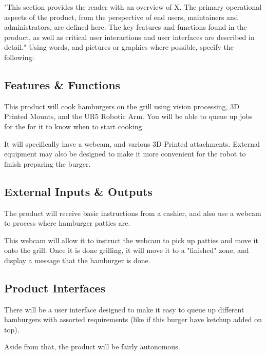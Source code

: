 "This section provides the reader with an overview of X. The primary operational aspects of the product, from the perspective of end users, maintainers and administrators, are defined here. The key features and functions found in the product, as well as critical user interactions and user interfaces are described in detail." Using words, and pictures or graphics where possible, specify the following:

\subsection{Features \& Functions}

This product will cook hamburgers on the grill using vision processing, 3D Printed Mounts, and the UR5 Robotic Arm. You will be able to queue up jobs for the \productname{} for it to know when to start cooking. 

It will specifically have a webcam, and various 3D Printed attachments. External equipment may also be designed to make it more convenient for the robot to finish preparing the burger. 

\subsection{External Inputs \& Outputs}
The product will receive basic instructions from a cashier, and also use a webcam to process where hamburger patties are. 

This webcam will allow it to instruct the webcam to pick up patties and move it onto the grill. Once it is done grilling, it will move it to a "finished" zone, and display a message that the hamburger is done. 


\subsection{Product Interfaces}
There will be a user interface designed to make it easy to queue up different hamburgers with assorted requirements (like if this burger have ketchup added on top). 

Aside from that, the product will be fairly autonomous. 